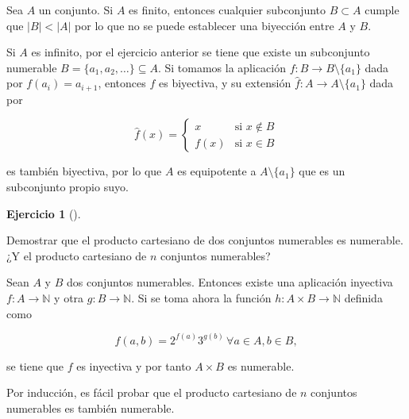 \documentclass[
  a4paper,
]{scrreport}
\theoremstyle{definition}
\newtheorem{exercise}{Ejercicio}[chapter]
\theoremstyle{remark}
\begin{document}
\begin{tcolorbox}[enhanced jigsaw, breakable, title=\textcolor{quarto-callout-tip-color}{\faLightbulb}\hspace{0.5em}{Solución}, left=2mm, leftrule=.75mm, colback=white, bottomtitle=1mm, coltitle=black, bottomrule=.15mm, colframe=quarto-callout-tip-color-frame, colbacktitle=quarto-callout-tip-color!10!white, rightrule=.15mm, opacitybacktitle=0.6, arc=.35mm, toprule=.15mm, opacityback=0, toptitle=1mm, titlerule=0mm]
Sea \(A\) un conjunto. Si \(A\) es finito, entonces cualquier
subconjunto \(B\subset A\) cumple que \(|B| < |A|\) por lo que no se
puede establecer una biyección entre \(A\) y \(B\).

Si \(A\) es infinito, por el ejercicio anterior se tiene que existe un
subconjunto numerable \(B=\{a_1,a_2,\ldots\}\subseteq A\). Si tomamos la
aplicación \(f:B\to B\setminus\{a_1\}\) dada por \(f(a_i)=a_{i+1}\),
entonces \(f\) es biyectiva, y su extensión
\(\hat f: A\to A\setminus\{a_1\}\) dada por

\[
\hat f(x)=
\begin{cases}
x & \mbox{si } x\not\in B\\
f(x) & \mbox{si } x\in B
\end{cases}
\]

es también biyectiva, por lo que \(A\) es equipotente a
\(A\setminus \{a_1\}\) que es un subconjunto propio suyo.
\end{tcolorbox}

\leavevmode{}%
\begin{exercise}[]\label{exr-producto-cartesiano-numerable}

Demostrar que el producto cartesiano de dos conjuntos numerables es
numerable. ¿Y el producto cartesiano de \(n\) conjuntos numerables?

\end{exercise}

\begin{tcolorbox}[enhanced jigsaw, breakable, title=\textcolor{quarto-callout-tip-color}{\faLightbulb}\hspace{0.5em}{Solución}, left=2mm, leftrule=.75mm, colback=white, bottomtitle=1mm, coltitle=black, bottomrule=.15mm, colframe=quarto-callout-tip-color-frame, colbacktitle=quarto-callout-tip-color!10!white, rightrule=.15mm, opacitybacktitle=0.6, arc=.35mm, toprule=.15mm, opacityback=0, toptitle=1mm, titlerule=0mm]
Sean \(A\) y \(B\) dos conjuntos numerables. Entonces existe una
aplicación inyectiva \(f:A\to\mathbb{N}\) y otra \(g:B\to\mathbb{N}\).
Si se toma ahora la función \(h:A\times B\to \mathbb{N}\) definida como

\[ f(a,b) = 2^{f(a)}3^{g(b)}\, \forall a\in A, b\in B,\]

se tiene que \(f\) es inyectiva y por tanto \(A\times B\) es numerable.

Por inducción, es fácil probar que el producto cartesiano de \(n\)
conjuntos numerables es también numerable.
\end{tcolorbox}
\end{document}
